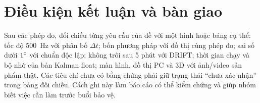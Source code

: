 \section{Điều kiện kết luận và bàn giao}
Sau các phép đo, đối chiếu từng yêu cầu của đề với một hình hoặc bảng cụ thể: tốc độ 500~Hz với phân bố $\Delta t$; bốn phương pháp với đồ thị cùng phép đo; sai số dưới $1^{\circ}$ với chuẩn độc lập; không trôi sau 5 phút với DRIFT; thời gian chạy và bộ nhớ của bản Kalman float; màn hình, đồ thị PC và 3D với ảnh/video sản phẩm thật. Các tiêu chí chưa có bằng chứng phải giữ trạng thái ``chưa xác nhận'' trong bảng đối chiếu. Cách ghi này làm báo cáo có thể kiểm chứng và giúp nhóm biết việc cần làm trước buổi bảo vệ.
